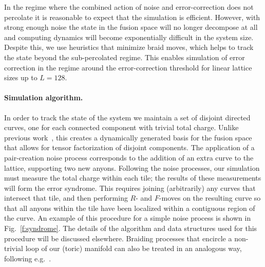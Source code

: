 \documentclass[aps, prl, letterpaper, twocolumn, superscriptaddress, notitlepage, 10pt]{revtex4-1}
\newcommand{\Fref}[1]{Fig.~\ref{#1}}
\begin{document}
In the regime where the combined action of noise and error-correction does not percolate
it is reasonable to expect that the simulation is efficient.
However, with strong enough noise the state in the fusion space will
no longer decompose at all and computing dynamics will
become exponentially difficult in the system size.
Despite this, we use heuristics 
that minimize braid moves, which helps to
track the state beyond the
sub-percolated regime.
This enables simulation of error correction in
the regime around the error-correction threshold for linear lattice sizes up to $L=128$.

\paragraph{Simulation algorithm.}

In order to track the state of the system we maintain 
a set of disjoint directed curves, 
one for each connected component with trivial total charge.
Unlike previous work~\cite{Brell2013}, this creates a dynamically generated basis for the fusion space 
that allows for tensor factorization of disjoint components.
The application of a pair-creation noise process corresponds to the 
addition of an extra curve to the lattice, supporting
two new anyons.
Following the noise processes, our simulation must 
measure the total charge within each tile; the results of 
these measurements will form the error syndrome. 
This requires joining (arbitrarily) any curves that intersect that tile, 
and then performing $R$- and $F$-moves on the resulting
curve so that 
all anyons within the tile have been 
localized within a contiguous region of the curve. 
An example of this 
procedure for a simple noise process is shown in \Fref{f:syndrome}.
The details of the algorithm and data structures used for 
this procedure will be discussed elsewhere.
Braiding processes that encircle 
a non-trivial loop of our (toric) manifold can also be 
treated in an analogous way, following e.g.~\cite{Pfeifer2012}.
\end{document}
